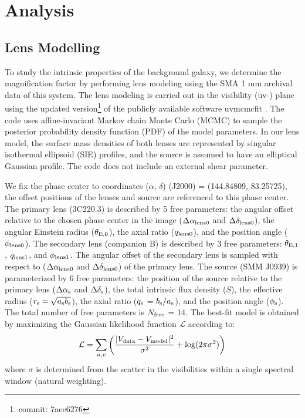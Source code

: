 \documentclass[twocolumn,apj,numberedappendix]{emulateapj}
\begin{document}
\section{Analysis}
\subsection{Lens Modelling} \label{sec:Lens} 
To study the intrinsic properties of the background galaxy, we determine the magnification factor by performing
lens modeling using the SMA 1 mm archival data of this system. The lens modeling is carried out in the visibility
(uv-) plane using the updated version\footnote{commit: 7aee6276} of the publicly available software {\sc uvmcmcfit}
\citep{Bussmann15a}. The code uses affine-invariant Markov chain Monte Carlo (MCMC) to sample the posterior
probability density function (PDF) of the model parameters. In our lens model, the surface mass densities of both
lenses are represented by singular isothermal ellipsoid (SIE) profiles, and the source is assumed to have an
elliptical Gaussian profile. The code does not include an external shear parameter.

We fix the phase center to coordinates ($\alpha$, $\delta$) (J2000) = (144.84809\degr, 83.25725\degr), the
offset positions of the lenses and source are referenced to this phase center. The primary lens (3C220.3) is
described by 5 free parameters: the angular offset relative to
the chosen phase center in the image ($\Delta \alpha_{\rm
lens0}$ and $\Delta \delta_{\rm lens0}$), the angular Einstein radius ($\theta_{\rm E,0}$), the
axial ratio ($q_{\rm lens0}$), and the position angle ($\phi_{\rm lens0}$). The secondary lens (companion B) is
described by 3 free parameters: $\theta_{\rm E,1}$, $q_{\rm lens1}$, and $\phi_{\rm lens1}$. The angular offset
of the secondary
lens is sampled with respect to ($\Delta \alpha_{\rm lens0}$ and $\Delta \delta_{\rm lens0}$) of
the primary lens.
The source (SMM J0939) is parameterized by
6 free parameters: the position of the source relative to the
primary lens ($\Delta \alpha_{\rm s}$ and $\Delta
\delta_{\rm s}$), the total intrinsic flux density ($S$), the
effective radius ($r_{\rm s} = \sqrt{a_{\rm s} b_{\rm s}}$), the axial
ratio ($q_{\rm s}$ =  $b_{\rm s}/a_{\rm s}$), and the position angle
($\phi_{\rm s}$).
The total number of free parameters is $N_{\rm free}$ = 14. The best-fit model is obtained by maximizing the
Gaussian likelihood function $ \mathcal{L} $ according to:
\begin{equation}
    \mathcal{L} = \sum_{u, v}\left( \frac{|V_{\rm data} - V_{\rm
    model}|^2}{\sigma^2} + {\rm log}(2 \pi \sigma^2) \right)
\end{equation}
\noindent where $\sigma$ is determined from the scatter in the visibilities within a
single spectral window (natural weighting).
\end{document}
